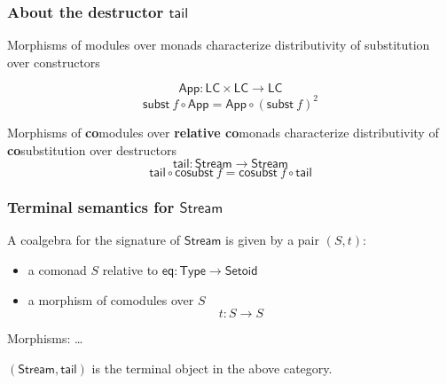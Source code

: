 \documentclass[
]
{beamer}
\newcommand{\constfont}[1]{\ensuremath{\mathsf{#1}}}
\newcommand{\bind}[2]{{#1}\mathbin{\gg\hspace{-.8ex}=}{#2}}
\newcommand{\stream}{\constfont{Stream}}
\newcommand{\stail}{\constfont{tail}}
\newcommand{\cosubst}{\constfont{cosubst}}
\newcommand{\comp}[2]{\ensuremath{{#2} \circ {#1}}}
\newcommand{\shift}{\constfont{shift}}
\newcommand{\subst}{\constfont{subst}}
\newcommand{\Setoid}{\constfont{Setoid}}
\newcommand{\eq}{\ensuremath{\mathsf{eq}}}
\newcommand{\App}{\constfont{App}}
\newcommand{\Abs}{\constfont{Abs}}
\newcommand{\LC}{\mathsf{LC}}
\newcommand{\Set}{\constfont{Type}}
\newcommand{\fat}[1]{\textbf{#1}}
\begin{document}
\begin{frame}
 \frametitle{About the destructor $\stail$}
 
 \begin{block}{Morphisms of modules over monads}
   characterize distributivity of substitution over constructors

         \[ \App : \LC\times\LC \to \LC \]
         \[ \comp{\App}{\subst~f} = \comp{(\subst~f)^2}{\App} \]

 \end{block}

 \begin{block}{Morphisms of \fat{co}modules over \fat{relative co}monads}
   characterize distributivity of \fat{co}substitution over destructors
         \[\stail : \stream \to \stream\]
          \[ \comp{\cosubst~f}{\stail} = \comp{\stail}{\cosubst~f} \]
 \end{block} 
 
\end{frame}


\begin{frame}
 \frametitle{Terminal semantics for $\stream$}
 
  \begin{definition}
    A coalgebra for the signature of $\stream$ is given by a pair $(S,t)$:
    \begin{itemize}
     \item a comonad $S$ relative to $\eq: \Set \to \Setoid$
     \item a morphism of comodules over $S$
        \[  t : S \to S \]
    \end{itemize}
   Morphisms: \ldots
  \end{definition}

 \begin{lemma}
  $(\stream,\stail)$ is the terminal object in the above category.
 \end{lemma}
  
\end{frame}
\end{document}
